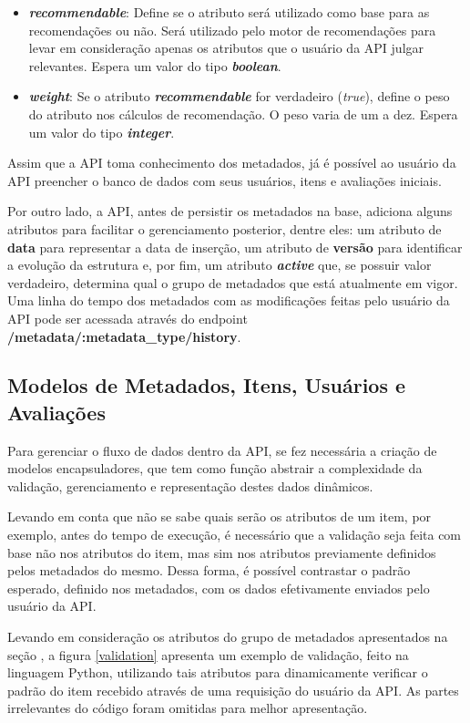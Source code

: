 \begin{itemize}
	\item \textbf{\textit{recommendable}}: Define se o atributo será utilizado como base para as recomendações ou não. Será utilizado pelo motor de recomendações para levar em consideração apenas os atributos que o usuário da API julgar relevantes. Espera um valor do tipo \textbf{\textit{boolean}}.

	\item \textbf{\textit{weight}}: Se o atributo \textbf{\textit{recommendable}} for verdadeiro (\textit{true}), define o peso do atributo nos cálculos de recomendação. O peso varia de um a dez. Espera um valor do tipo \textbf{\textit{integer}}.
\end{itemize}

Assim que a API toma conhecimento dos metadados, já é possível ao usuário da API preencher o banco de dados com seus usuários, itens e avaliações iniciais.

Por outro lado, a API, antes de persistir os metadados na base, adiciona alguns atributos para facilitar o gerenciamento posterior, dentre eles: um atributo de \textbf{data} para representar a data de inserção, um atributo de \textbf{versão} para identificar a evolução da estrutura e, por fim, um atributo \textbf{\textit{active}} que, se possuir valor verdadeiro, determina qual o grupo de metadados que está atualmente em vigor. Uma linha do tempo dos metadados com as modificações feitas pelo usuário da API pode ser acessada através do endpoint \textbf{/metadata/:metadata\_type/history}.

\subsection{Modelos de Metadados, Itens, Usuários e Avaliações} \label{analisador:modelos}

Para gerenciar o fluxo de dados dentro da API, se fez necessária a criação de modelos encapsuladores, que tem como função abstrair a complexidade da validação, gerenciamento e representação destes dados dinâmicos.

Levando em conta que não se sabe quais serão os atributos de um item, por exemplo, antes do tempo de execução, é necessário que a validação seja feita com base não nos atributos do item, mas sim nos atributos previamente definidos pelos metadados do mesmo. Dessa forma, é possível contrastar o padrão esperado, definido nos metadados, com os dados efetivamente enviados pelo usuário da API.

Levando em consideração os atributos do grupo de metadados apresentados na seção , a figura \ref{validation} apresenta um exemplo de validação, feito na linguagem Python, utilizando tais atributos para dinamicamente verificar o padrão do item recebido através de uma requisição do usuário da API. As partes irrelevantes do código foram omitidas para melhor apresentação.

